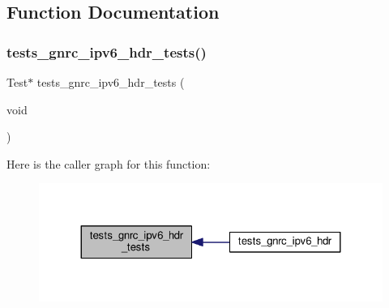 \subsection{Function Documentation}
\mbox{\label{tests-gnrc__ipv6__hdr_8c_a10c8350ed23c4b8fa76c4123ed5b38a4}} 
\subsubsection{\texorpdfstring{tests\+\_\+gnrc\+\_\+ipv6\+\_\+hdr\+\_\+tests()}{tests\_gnrc\_ipv6\_hdr\_tests()}}
{\footnotesize\ttfamily Test$\ast$ tests\+\_\+gnrc\+\_\+ipv6\+\_\+hdr\+\_\+tests (\begin{DoxyParamCaption}\item[{void}]{ }\end{DoxyParamCaption})}

Here is the caller graph for this function\+:
\nopagebreak
\begin{figure}[H]
\begin{center}
\leavevmode
\includegraphics[width=324pt]{tests-gnrc__ipv6__hdr_8c_a10c8350ed23c4b8fa76c4123ed5b38a4_icgraph}
\end{center}
\end{figure}
